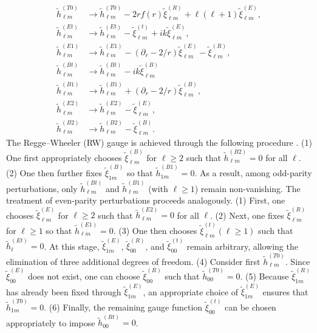 \documentclass[reprint,amsmath,amssymb,aps,prd]{revtex4-2}
\begin{document}
\begin{widetext}
\begin{subequations}
\begin{align}
\tilde{h}_{\ell m}^{(T0)}&\rightarrow \tilde{h}_{\ell m}^{(T0)}
-2rf(r)\tilde{\xi}_{\ell m}^{(R)}+\ell(\ell+1)\tilde{\xi}_{\ell m}^{(E)},\\
\tilde{h}_{\ell m}^{(Et)}&\rightarrow \tilde{h}_{\ell m}^{(Et)}
-\tilde{\xi}_{\ell m}^{(t)}+ik\tilde{\xi}_{\ell m}^{(E)},\\
\tilde{h}_{\ell m}^{(E1)}&\rightarrow \tilde{h}_{\ell m}^{(E1)}
-(\partial_{r}-2/r)\tilde{\xi}_{\ell m}^{(E)}
-\tilde{\xi}_{\ell m}^{(R)},\\
\tilde{h}_{\ell m}^{(Bt)}&\rightarrow \tilde{h}_{\ell m}^{(Bt)}
-ik\tilde{\xi}_{\ell m}^{(B)}\\
\tilde{h}_{\ell m}^{(B1)}&\rightarrow \tilde{h}_{\ell m}^{(B1)}
+(\partial_{r}-2/r)\tilde{\xi}_{\ell m}^{(B)},\\
\tilde{h}_{\ell m}^{(E2)}&\rightarrow \tilde{h}_{\ell m}^{(E2)}
-\tilde{\xi}_{\ell m}^{(E)},\\
\tilde{h}_{\ell m}^{(B2)}&\rightarrow \tilde{h}_{\ell m}^{(B2)}
-\tilde{\xi}_{\ell m}^{(B)}.
\end{align}
\end{subequations}
The Regge–Wheeler (RW) gauge is achieved through the following procedure \cite{Maggiore_2018_b}. (1) One first appropriately chooses $\tilde{\xi}^{(B)}_{\ell m}$ for $\ell\geqslant2$ such that $\tilde{h}^{(B2)}_{\ell m}=0$ for all $\ell$. (2) One then further fixes $\tilde{\xi}^{(B)}_{1m}$ so that $\tilde{h}^{(B1)}_{1m}=0$. As a result, among odd-parity perturbations, only
$\tilde{h}^{(Bt)}_{\ell m}$ and $\tilde{h}^{(B1)}_{\ell m}$ (with $\ell\geqslant1$) remain non-vanishing. The treatment of even-parity perturbations proceeds analogously. (1) First, one chooses $\tilde{\xi}^{(E)}_{\ell m}$ for $\ell\geqslant2$ such that $\tilde{h}^{(E2)}_{\ell m}=0$ for all $\ell$. (2) Next, one fixes $\tilde{\xi}^{(R)}_{\ell m}$ for $\ell\geqslant1$ so that $\tilde{h}^{(E1)}_{\ell m}=0$. (3) One then chooses $\tilde{\xi}^{(t)}_{\ell m} (\ell\geqslant1)$ such that $\tilde{h}^{(Et)}_{\ell}=0$. 
At this stage, $\tilde{\xi}^{(E)}_{1m}$, $\tilde{\xi}^{(R)}_{00}$, and $\tilde{\xi}^{(t)}_{00}$ remain arbitrary, allowing the elimination of three additional degrees of freedom. (4) Consider first $\tilde{h}^{(T0)}_{\ell m}$. Since $\tilde{\xi}_{00}^{(E)}$ does not exist, one can choose $\tilde{\xi}^{(R)}_{00}$ such that $\tilde{h}^{(T0)}_{00}=0$. (5) Because $\tilde{\xi}^{(R)}_{1m}$ has already been fixed through $\tilde{\xi}^{(E)}_{1m}$, an appropriate choice of $\tilde{\xi}^{(E)}_{1m}$ ensures that $\tilde{h}^{(T0)}_{1m}=0$. (6) Finally, the remaining gauge function $\tilde{\xi}^{(t)}_{00}$ can be chosen appropriately to impose $\tilde{h}^{(Rt)}_{00}=0$.


\end{widetext}
\end{document}
